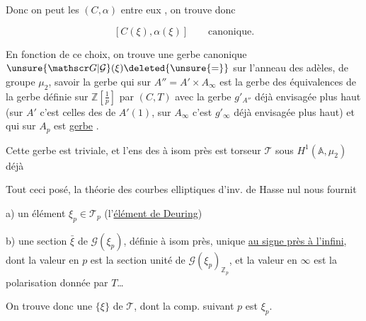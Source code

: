 
Donc on peut   les $(C,\alpha)$  entre
eux , on trouve donc

\[
[C(\xi),\alpha(\xi)]\qquad\text{canonique.}
\]


En fonction de ce choix, on trouve une gerbe
canonique $\unsure{\mathscr G|\mathcal G}(\xi)\deleted{\unsure{=}}$ sur l'anneau des adèles,
de groupe $\mu_2$, savoir la gerbe qui sur $A''=A'\times A_\infty$ est
la gerbe des équivalences  de la gerbe  
définie sur $\mathbb Z[\frac1p]$ par $(C,T)$  avec la gerbe
$g'_{A''}$ déjà envisagée plus haut (sur $A'$ c'est celles
des \unsure{$\sqrt{\ }$} de $A'(1)$, sur $A_\infty$ c'est $g'_\infty$ déjà envisagée
plus haut) et qui sur $A_p$ est  \uline{gerbe} .

Cette gerbe est  triviale, et l'ens des  à isom
 près est  torseur $\mathcal T$ sous $H^1(\mathbb A,\mu_2)$ déjà


Tout ceci posé, la théorie  des courbes elliptiques
d'inv. de Hasse nul nous fournit

a) un élément $\xi_p\in\mathcal T_p$ (l'\uline{élément de Deuring})

b) une section  $\bar\xi$ de $\mathscr G(\xi_p)$, définie
à isom près, unique \uline{au signe près à l'infini},
dont la valeur en $p$  est la section unité
 de $\mathscr G(\xi_p)_{\mathbb Z_p}$, et la valeur en $\infty$ est la
polarisation donnée par $T$\ldots

On trouve donc une  $\{\xi\}$ de $\mathcal T$, dont la
comp. suivant $p$ est $\xi_p$.

